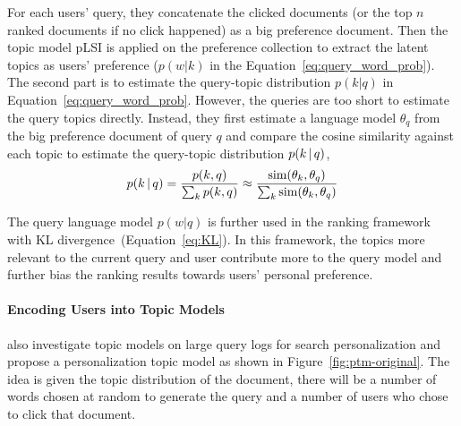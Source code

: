 For each users' query, they concatenate the clicked documents (or the top $n$ ranked documents if no click happened) as a big preference document. Then the topic model pLSI is applied on the preference collection to extract the latent topics as users' preference ($p(w|k)$ in the Equation~\ref{eq:query_word_prob}). The second part is to estimate the query-topic distribution $p(k|q)$ in Equation~\ref{eq:query_word_prob}. However, the queries are too short to estimate the query topics directly. Instead, they first estimate a language model $\theta_q$ from the big preference document of query $q$ and compare the cosine similarity against each topic to estimate the query-topic distribution $p(k \, | \, q)$,
\begin{align}
p(k \, | \, q) = \frac{p(k, q)}{\sum_k p(k, q)} \approx \frac{\text{sim}(\theta_k, \theta_q)}{\sum_k \text{sim}(\theta_k, \theta_q)}
\end{align}

The query language model $p(w|q)$ is further used in the ranking framework with KL divergence~(Equation~\ref{eq:KL}). In this framework, the topics more relevant to the current query and user contribute more to the query model and further bias the ranking results towards users' personal preference.

\paragraph{Encoding Users into Topic Models}

\citet{Carman-2010} also investigate topic models on large query logs for search personalization and propose a personalization topic model as shown in Figure~\ref{fig:ptm-original}. The idea is given the topic distribution of the document, there will be a number of words chosen at random to generate the query and a number of users who chose to click that document.

